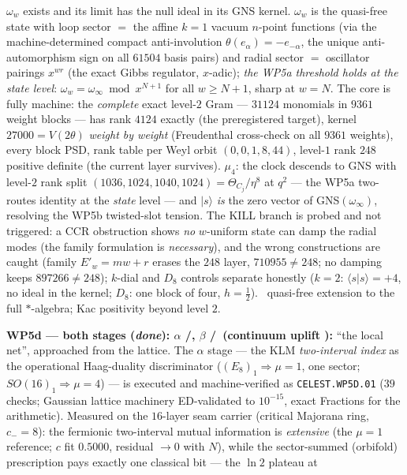 $\omega_w$ exists and its limit has the null ideal in its GNS kernel. $\omega_w$ is the quasi-free
state with loop sector $=$ the affine $k{=}1$ vacuum $n$-point functions (via the machine-determined
compact anti-involution $\theta(e_\alpha)={-}e_{-\alpha}$, the unique anti-automorphism sign on all
$61504$ basis pairs) and radial sector $=$ oscillator pairings $x^{wr}$ (the exact Gibbs regulator,
$x$-adic); \emph{the WP5a threshold holds at the state level}: $\omega_w=\omega_\infty\bmod x^{N+1}$
for all $w\ge N{+}1$, sharp at $w=N$. The core is fully machine: the \emph{complete} exact level-$2$
Gram --- $31124$ monomials in $9361$ weight blocks --- has rank $4124$ exactly (the preregistered
target), kernel $27000=V(2\theta)$ \emph{weight by weight} (Freudenthal cross-check on all $9361$
weights), every block PSD, rank table per Weyl orbit $(0,0,1,8,44)$, level-$1$ rank $248$ positive
definite (the current layer survives). $\mu_4$: the clock descends to GNS with level-$2$ rank split
$(1036,1024,1040,1024)=\Theta_{C_j}/\eta^8$ at $q^2$ --- the WP5a two-routes identity at the
\emph{state} level --- and $|s\rangle$ \emph{is} the zero vector of GNS$(\omega_\infty)$, resolving
the WP5b twisted-slot tension. The KILL branch is probed and not triggered: a CCR obstruction shows
\emph{no} $w$-uniform state can damp the radial modes (the family formulation is \emph{necessary}),
and the wrong constructions are caught (family $E'_w=mw{+}r$ erases the $248$ layer,
$710955\neq248$; no damping keeps $897266\neq248$); $k$-dial and $D_8$ controls separate honestly
($k{=}2$: $\langle s|s\rangle={+}4$, no ideal in the kernel; $D_8$: one block of four, $h=\tfrac12$).
\mC\ quasi-free extension to the full $*$-algebra; Kac positivity beyond level $2$.
\item \textbf{WP5d --- both stages (\emph{done}): $\alpha$ \mE/\mC, $\beta$ \mE/\mC\ (continuum
uplift \mO):} ``the local net'',
approached from the lattice. The $\alpha$ stage --- the KLM \emph{two-interval index} as the
operational Haag-duality discriminator ($(E_8)_1\Rightarrow\mu{=}1$, one sector;
$SO(16)_1\Rightarrow\mu{=}4$) --- is executed and machine-verified as \texttt{CELEST.WP5D.01}
 ($39$ checks; Gaussian lattice machinery
ED-validated to $10^{-15}$, exact Fractions for the arithmetic). Measured on the $16$-layer seam
carrier (critical Majorana ring, $c_-=8$): the fermionic two-interval mutual information is
\emph{extensive} (the $\mu{=}1$ reference; $c$ fit $0.5000$, residual $\to0$ with $N$), while the
sector-summed (orbifold) prescription pays exactly one classical bit --- the $\ln2$ plateau at
